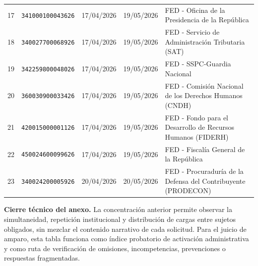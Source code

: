 \documentclass[11pt,letterpaper]{article}
\begin{document}
\begin{longtable}{C{0.7cm} L{3.15cm} C{2.05cm} C{2.05cm} L{8.55cm}}
17 & \texttt{341000100043626} & 17/04/2026 & 19/05/2026 & FED - Oficina de la Presidencia de la República \\
18 & \texttt{340027700068926} & 17/04/2026 & 19/05/2026 & FED - Servicio de Administración Tributaria (SAT) \\
19 & \texttt{342259800048026} & 17/04/2026 & 19/05/2026 & FED - SSPC-Guardia Nacional \\
20 & \texttt{360030900033426} & 17/04/2026 & 19/05/2026 & FED - Comisión Nacional de los Derechos Humanos (CNDH) \\
21 & \texttt{420015000001126} & 17/04/2026 & 19/05/2026 & FED - Fondo para el Desarrollo de Recursos Humanos (FIDERH) \\
22 & \texttt{450024600099626} & 17/04/2026 & 19/05/2026 & FED - Fiscalía General de la República \\
23 & \texttt{340024200005926} & 20/04/2026 & 20/05/2026 & FED - Procuraduría de la Defensa del Contribuyente (PRODECON) \\

\end{longtable}
\normalsize

\vspace{4mm}

\begin{tcolorbox}[
  enhanced,
  colback=white,
  colframe=OroArchivo,
  boxrule=0.7pt,
  arc=2mm,
  left=7pt,right=7pt,top=6pt,bottom=6pt
]
\textbf{Cierre técnico del anexo.} La concentración anterior permite observar la simultaneidad, repetición institucional y distribución de cargas entre sujetos obligados, sin mezclar el contenido narrativo de cada solicitud. Para el juicio de amparo, esta tabla funciona como índice probatorio de activación administrativa y como ruta de verificación de omisiones, incompetencias, prevenciones o respuestas fragmentadas.
\end{tcolorbox}
\end{document}
